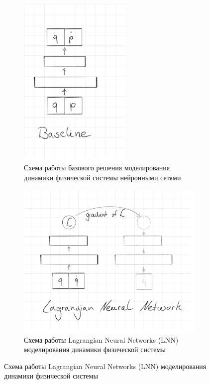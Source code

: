 \documentclass[12pt]{article}
\begin{document}
	\begin{figure}[H]
		\centering
		\begin{subfigure}[b]{0.49\textwidth}
			\centering
			\includegraphics[width=0.6\textwidth]{baseline_nn_scheme.png}
			\caption{Схема работы базового решения моделирования динамики физической системы нейронными сетями}
			\label{fig:y equals x}
		\end{subfigure}
		\hfill
		\begin{subfigure}[b]{0.49\textwidth}
			\centering
			\includegraphics[width=\textwidth]{lnn_scheme.png}
			\caption{Схема работы Lagrangian Neural Networks (LNN) моделирования динамики физической системы}
			\label{fig:three sin x}
		\end{subfigure}
	\end{figure}
\end{document}
